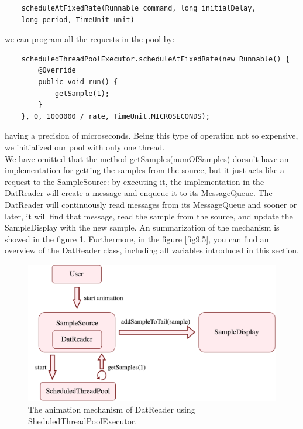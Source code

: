 \begin{lstlisting}
	scheduleAtFixedRate(Runnable command, long initialDelay,
	long period, TimeUnit unit)
\end{lstlisting}
we can program all the requests in the pool by:
\begin{lstlisting}
	scheduledThreadPoolExecutor.scheduleAtFixedRate(new Runnable() {
		@Override
		public void run() {
			getSample(1);
		}
	}, 0, 1000000 / rate, TimeUnit.MICROSECONDS);
\end{lstlisting}
having a precision of microseconds. Being this type of operation not so expensive, we initialized our pool with only one thread.\\
We have omitted that the method getSamples(numOfSamples) doesn’t have an implementation for getting the samples from the source, but it just acts like a request to the SampleSource: by executing it, the implementation in the DatReader will create a message and enqueue it to its MessageQueue. The DatReader will continuously read messages from its MessageQueue and sooner or later, it will find that message, read the sample from the source, and update the SampleDisplay with the new sample. An summarization of the mechanism is showed in the figure \ref{fig9.4}. Furthermore, in the figure \ref{fig9.5}, you can find an overview of the DatReader class, including all variables introduced in this section.
\begin{figure}[ht!]
	\centering
	\includegraphics[width=120mm]{figures/ch9/4.png}
	\caption{The animation mechanism of DatReader using SheduledThreadPoolExecutor.}
	\label{fig9.4}
\end{figure}
